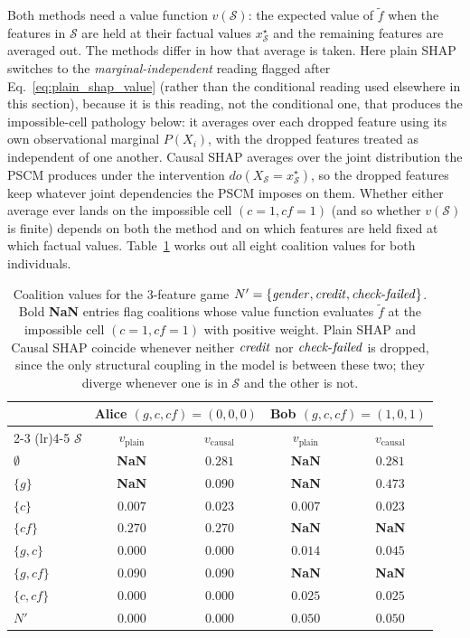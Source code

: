 Both methods need a value function $v(\mathcal{S})$: the expected value of $\tilde f$
when the features in $\mathcal{S}$ are held at their factual values $x_{\mathcal{S}}^\star$ and the
remaining features are averaged out. The methods differ in how that average
is taken. Here plain SHAP switches to the \emph{marginal-independent} reading
flagged after Eq.~\eqref{eq:plain_shap_value} (rather than the conditional
reading used elsewhere in this section), because it is this reading, not the
conditional one, that produces the impossible-cell pathology below: it
averages over each dropped feature using its own
observational marginal $P(X_i)$, with the dropped features treated as
independent of one another. Causal SHAP averages over the joint distribution
the PSCM produces under the intervention $do(X_{\mathcal{S}} = x_{\mathcal{S}}^\star)$, so the dropped
features keep whatever joint dependencies the PSCM imposes on them. Whether
either average ever lands on the impossible cell $(c{=}1, cf{=}1)$ (and so
whether $v(\mathcal{S})$ is finite) depends on both the method and on which features
are held fixed at which factual values. Table~\ref{tab:vS_optionB} works out
all eight coalition values for both individuals.

\begin{table}[ht]
\centering
\small
\begin{tabular}{l cc cc}
\toprule
& \multicolumn{2}{c}{Alice $(g,c,cf){=}(0,0,0)$} & \multicolumn{2}{c}{Bob $(g,c,cf){=}(1,0,1)$} \\
\cmidrule(lr){2-3} \cmidrule(lr){4-5}
$\mathcal{S}$ & $v_{\mathrm{plain}}$ & $v_{\mathrm{causal}}$ & $v_{\mathrm{plain}}$ & $v_{\mathrm{causal}}$ \\
\midrule
$\emptyset$    & \textbf{NaN} & $0.281$ & \textbf{NaN} & $0.281$ \\
$\{g\}$        & \textbf{NaN} & $0.090$ & \textbf{NaN} & $0.473$ \\
$\{c\}$        & $0.007$      & $0.023$ & $0.007$      & $0.023$ \\
$\{cf\}$       & $0.270$      & $0.270$ & \textbf{NaN} & \textbf{NaN} \\
$\{g,c\}$      & $0.000$      & $0.000$ & $0.014$      & $0.045$ \\
$\{g,cf\}$     & $0.090$      & $0.090$ & \textbf{NaN} & \textbf{NaN} \\
$\{c,cf\}$     & $0.000$      & $0.000$ & $0.025$      & $0.025$ \\
$N'$           & $0.000$      & $0.000$ & $0.050$      & $0.050$ \\
\bottomrule
\end{tabular}
\caption{Coalition values for the 3-feature game
$N' = \{\varname{gender},\varname{credit},\varname{check\text{-}failed}\}$.
Bold \textbf{NaN} entries flag coalitions whose value function evaluates
$\tilde f$ at the impossible cell $(c{=}1,cf{=}1)$ with positive weight.
Plain SHAP and Causal SHAP coincide whenever neither $\varname{credit}$ nor
$\varname{check\text{-}failed}$ is dropped, since the only structural coupling
in the model is between these two; they diverge whenever one is in $\mathcal{S}$ and the
other is not.}
\label{tab:vS_optionB}
\end{table}

